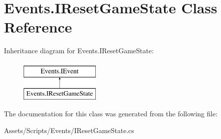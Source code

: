 \hypertarget{class_events_1_1_i_reset_game_state}{}\section{Events.\+I\+Reset\+Game\+State Class Reference}
\label{class_events_1_1_i_reset_game_state}
Inheritance diagram for Events.\+I\+Reset\+Game\+State\+:\begin{figure}[H]
\begin{center}
\leavevmode
\includegraphics[height=2.000000cm]{class_events_1_1_i_reset_game_state}
\end{center}
\end{figure}


The documentation for this class was generated from the following file\+:\begin{DoxyCompactItemize}
\item 
Assets/\+Scripts/\+Events/I\+Reset\+Game\+State.\+cs\end{DoxyCompactItemize}

